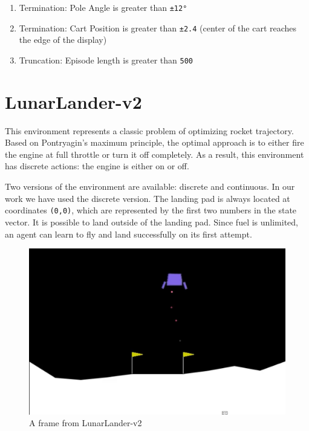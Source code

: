 \documentclass{article} %
\begin{document}
\begin{enumerate}
    \item Termination: Pole Angle is greater than \verb|±12°|
    \item Termination: Cart Position is greater than \verb|±2.4| (center of the cart
    reaches the edge of the display)
    \item Truncation: Episode length is greater than \verb|500|
\end{enumerate}


\section{LunarLander-v2}

This environment represents a classic problem of optimizing rocket trajectory. Based on Pontryagin’s maximum principle, the optimal approach is to either fire the engine at full throttle or turn it off completely. As a result, this environment has discrete actions: the engine is either on or off.

Two versions of the environment are available: discrete and continuous. In our work we have used the discrete version. The landing pad is always located at coordinates \verb|(0,0)|, which are represented by the first two numbers in the state vector. It is possible to land outside of the landing pad. Since fuel is unlimited, an agent can learn to fly and land successfully on its first attempt.

\begin{figure}[h]
    \begin{center}
        \includegraphics[width=\textwidth]{lunar_lander.png}
    \end{center}
    \caption{A frame from LunarLander-v2}
    \label{fig:mcar-rendering}
\end{figure}
\end{document}
